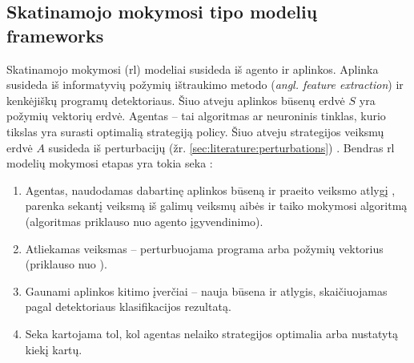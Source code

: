 \subsection{Skatinamojo mokymosi tipo modelių \glspl{framework}}\label{sec:literature:rl}

Skatinamojo mokymosi (\gls{rl}) modeliai susideda iš agento ir aplinkos.
Aplinka susideda iš informatyvių požymių ištraukimo metodo (\textit{angl.
    feature extraction}) ir kenkėjiškų programų detektoriaus. Šiuo atveju aplinkos
būsenų erdvė $S$ yra požymių vektorių erdvė. Agentas -- tai algoritmas ar
neuroninis tinklas, kurio tikslas yra surasti optimalią strategiją
\gls{policy}. Šiuo atveju strategijos veiksmų erdvė $A$ susideda iš
perturbacijų (žr. \ref{sec:literature:perturbations})
\cite{fangEvadingMalwareEngines2019}. Bendras \gls{rl} modelių mokymosi etapas
yra tokia seka \cite{fangEvadingMalwareEngines2019,
    zhongReinforcementLearningBased2022}:
\begin{enumerate}
    \item Agentas, naudodamas dabartinę aplinkos būseną ir praeito veiksmo atlygį
          , parenka sekantį veiksmą iš galimų veiksmų aibės ir taiko
          mokymosi algoritmą (algoritmas priklauso nuo agento įgyvendinimo).
    \item Atliekamas veiksmas -- perturbuojama programa arba požymių vektorius (priklauso
          nuo ).
    \item Gaunami aplinkos kitimo įverčiai -- nauja būsena ir atlygis, skaičiuojamas
          pagal detektoriaus klasifikacijos rezultatą.
    \item Seka kartojama tol, kol agentas nelaiko strategijos optimalia arba nustatytą
          kiekį kartų.
\end{enumerate}

